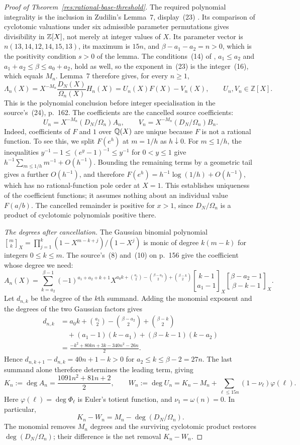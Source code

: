 \documentclass[11pt]{article}
\begin{document}
\begin{proof}[Proof of Theorem~\ref{res:rational-base-threshold}]
The required polynomial integrality is the inclusion in
Zudilin's Lemma~7, display~(23) \cite[p.~161]{zudilin2004}.
Its comparison of cyclotomic valuations under six admissible
parameter permutations gives divisibility in $\mathbb{Z}[X]$, not merely
at integer values of $X$.
Its parameter vector is $n(13,14,12,14,15,13)$, its maximum is $15n$, and
$\beta-a_1-a_2=n>0$, which is the positivity condition $s>0$ of the lemma.
The conditions~(14) of \cite[p.~157]{zudilin2004}, $a_1\le a_2$ and
$a_1+a_2\le\beta\le a_0+a_2$, hold as well, so the exponent in~(23) is the
integer~(16), which equals $M_n$. Lemma~7 therefore gives, for every
$n\ge1$,
\[
 \Lambda_n(X)=X^{-M_n}\frac{D_N(X)}{\Omega_n(X)}H_n(X)
            =U_n(X)F(X)-V_n(X),\qquad U_n,V_n\in\mathbb Z[X].
\]
This is the polynomial conclusion before integer specialisation in the
source's~(24), p.~162. The coefficients are the cancelled source coefficients:
\[
 U_n=X^{-M_n}(D_N/\Omega_n)A_n,\qquad
 V_n=X^{-M_n}(D_N/\Omega_n)B_n.
\]
Indeed, coefficients of $F$ and $1$ over $\mathbb{Q}(X)$ are unique because
$F$ is not a rational function. To see this, we split $F(e^h)$ at $m=1/h$ as $h\downarrow0$.
For $m\le1/h$, the inequalities
$y^{-1}-1\le(e^y-1)^{-1}\le y^{-1}$ for $0<y\le1$ give
$h^{-1}\sum_{m\le1/h}m^{-1}+O(h^{-1})$.
Bounding the remaining terms by a geometric tail gives a further
$O(h^{-1})$, and therefore
$F(e^h)=h^{-1}\log(1/h)+O(h^{-1})$, which has no rational-function
pole order at $X=1$. This establishes uniqueness of the coefficient
functions; it assumes nothing about an individual value $F(a/b)$.
The cancelled remainder is positive for $x>1$, since $D_N/\Omega_n$
is a product of cyclotomic polynomials positive there.

\emph{The degrees after cancellation.}
The Gaussian binomial polynomial
$\genfrac{[}{]}{0pt}{}{m}{k}_X=\prod_{j=1}^k(1-X^{m-k+j})/(1-X^j)$
is monic of degree $k(m-k)$ for integers $0\le k\le m$. The source's~(8) and~(10)
on p.~156 give the coefficient whose degree we need:
\[
 A_n(X)=\sum_{k=a_2}^{\beta-1}(-1)^{a_1+a_2+k+1}
 X^{a_0k+\binom{a_1}{2}-\binom{\beta-a_2}{2}+\binom{\beta-k}{2}}
 \genfrac{[}{]}{0pt}{}{k-1}{a_1-1}_X
 \genfrac{[}{]}{0pt}{}{\beta-a_2-1}{\beta-k-1}_X.
\]
Let $d_{n,k}$ be the degree of the $k$th summand. Adding the monomial
exponent and the degrees of the two Gaussian factors gives
\[
 \begin{aligned}
 d_{n,k}
 &=a_0k+\binom{a_1}{2}-\binom{\beta-a_2}{2}+\binom{\beta-k}{2}\\
 &\quad +(a_1-1)(k-a_1)+(\beta-k-1)(k-a_2)\\
 &=\frac{-k^2+80kn+3k-340n^2-26n}{2}.
 \end{aligned}
\]
Hence $d_{n,k+1}-d_{n,k}=40n+1-k>0$ for
$a_2\le k\le\beta-2=27n$. The last summand alone
therefore determines the leading term, giving
\[
 K_n:=\deg A_n=\frac{1091n^2+81n+2}{2},\qquad
 W_n:=\deg U_n=K_n-M_n+\sum_{\ell\le15n}(1-\nu_\ell)\varphi(\ell).
\]
Here $\varphi(\ell)=\deg\Phi_\ell$ is Euler's totient function, and
$\nu_1=\omega(n)=0$. In particular,
\[
 K_n-W_n=M_n-\deg(D_N/\Omega_n).
\]
The monomial removes $M_n$ degrees and the surviving cyclotomic
product restores $\deg(D_N/\Omega_n)$; their difference is the
net removal $K_n-W_n$.


\end{proof}
\end{document}
